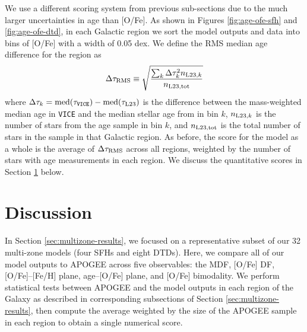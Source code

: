 \documentclass[twocolumn,twocolappendix,linenumbers]{aastex631}
\newcommand{\vice}{{\tt VICE}\xspace}
\begin{document}
We use a different scoring system from previous sub-sections due to the much larger uncertainties in age than [O/Fe]. As shown in Figures \ref{fig:age-ofe-sfh} and \ref{fig:age-ofe-dtd}, in each Galactic region we sort the model outputs and data into bins of [O/Fe] with a width of 0.05 dex. We define the RMS median age difference for the region as
\begin{equation}
    \Delta\tau_{\rm RMS} \equiv \sqrt{\frac{\sum_k \Delta\tau_k^2 n_{{\rm L23},k}}{n_{\rm L23,tot}}}
    \label{eq:age-ofe-score}
\end{equation}
where $\Delta\tau_k=\rm{med}(\tau_{\rm \vice})-\rm{med}(\tau_{\rm L23})$ is the difference between the mass-weighted median age in \vice and the median stellar age from  in bin $k$, $n_{{\rm L23},k}$ is the number of stars from the  age sample in bin $k$, and $n_{\rm L23,tot}$ is the total number of stars in the sample in that Galactic region. As before, the score for the model as a whole is the average of $\Delta \tau_{\rm RMS}$ across all regions, weighted by the number of stars with age measurements in each region. 
We discuss the quantitative scores in Section \ref{sec:discussion} below.


\section{Discussion}
\label{sec:discussion}

\vspace{-24pt}

In Section \ref{sec:multizone-results}, we focused on a representative subset of our 32 multi-zone models (four SFHs and eight DTDs). 
Here, we compare all of our model outputs to APOGEE across five observables: the MDF, [O/Fe] DF, [O/Fe]--[Fe/H] plane, age--[O/Fe] plane, and [O/Fe] bimodality. We perform statistical tests between APOGEE and the model outputs in each region of the Galaxy as described in corresponding subsections of Section \ref{sec:multizone-results}, then compute the average weighted by the size of the APOGEE sample in each region to obtain a single numerical score.
\end{document}
